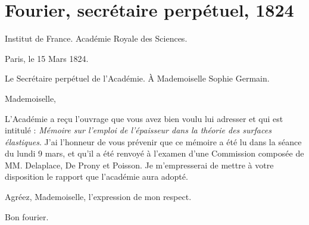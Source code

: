 \documentclass[11pt,a4paper]{article}
\begin{document}
\section{Fourier, secrétaire perpétuel, 1824}


Institut de France. Académie Royale des Sciences.

Paris, le 15 Mars 1824.

Le Secrétaire perpétuel de l'Académie. À Mademoiselle Sophie Germain.

Mademoiselle,

L'Académie a reçu l'ouvrage que vous avez bien voulu lui adresser et qui est
intitulé : \emph{Mémoire sur l'emploi de l'épaisseur dans la théorie des
surfaces élastiques}. J'ai l'honneur de vous prévenir que ce mémoire a été lu
dans la séance du lundi 9 mars, et qu'il a été renvoyé à l'examen d'une
Commission composée de MM. Delaplace, De Prony et Poisson. Je m'empresserai de
mettre à votre disposition le rapport que l'académie aura adopté.

Agréez, Mademoiselle, l'expression de mon respect.

Bon fourier.
\end{document}
